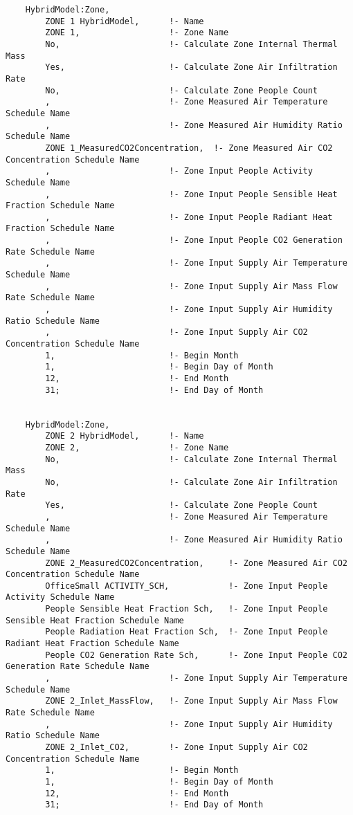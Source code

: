 \begin{lstlisting}
    HybridModel:Zone,
        ZONE 1 HybridModel,      !- Name
        ZONE 1,                  !- Zone Name
        No,                      !- Calculate Zone Internal Thermal Mass
        Yes,                     !- Calculate Zone Air Infiltration Rate
        No,                      !- Calculate Zone People Count
        ,                        !- Zone Measured Air Temperature Schedule Name
        ,                        !- Zone Measured Air Humidity Ratio Schedule Name
        ZONE 1_MeasuredCO2Concentration,  !- Zone Measured Air CO2 Concentration Schedule Name
        ,                        !- Zone Input People Activity Schedule Name
        ,                        !- Zone Input People Sensible Heat Fraction Schedule Name
        ,                        !- Zone Input People Radiant Heat Fraction Schedule Name
        ,                        !- Zone Input People CO2 Generation Rate Schedule Name
        ,                        !- Zone Input Supply Air Temperature Schedule Name
        ,                        !- Zone Input Supply Air Mass Flow Rate Schedule Name
        ,                        !- Zone Input Supply Air Humidity Ratio Schedule Name
        ,                        !- Zone Input Supply Air CO2 Concentration Schedule Name
        1,                       !- Begin Month
        1,                       !- Begin Day of Month
        12,                      !- End Month
        31;                      !- End Day of Month


    HybridModel:Zone,
        ZONE 2 HybridModel,      !- Name
        ZONE 2,                  !- Zone Name
        No,                      !- Calculate Zone Internal Thermal Mass
        No,                      !- Calculate Zone Air Infiltration Rate
        Yes,                     !- Calculate Zone People Count
        ,                        !- Zone Measured Air Temperature Schedule Name
        ,                        !- Zone Measured Air Humidity Ratio Schedule Name
        ZONE 2_MeasuredCO2Concentration,     !- Zone Measured Air CO2 Concentration Schedule Name
        OfficeSmall ACTIVITY_SCH,            !- Zone Input People Activity Schedule Name
        People Sensible Heat Fraction Sch,   !- Zone Input People Sensible Heat Fraction Schedule Name
        People Radiation Heat Fraction Sch,  !- Zone Input People Radiant Heat Fraction Schedule Name
        People CO2 Generation Rate Sch,      !- Zone Input People CO2 Generation Rate Schedule Name
        ,                        !- Zone Input Supply Air Temperature Schedule Name
        ZONE 2_Inlet_MassFlow,   !- Zone Input Supply Air Mass Flow Rate Schedule Name
        ,                        !- Zone Input Supply Air Humidity Ratio Schedule Name
        ZONE 2_Inlet_CO2,        !- Zone Input Supply Air CO2 Concentration Schedule Name
        1,                       !- Begin Month
        1,                       !- Begin Day of Month
        12,                      !- End Month
        31;                      !- End Day of Month

\end{lstlisting}


